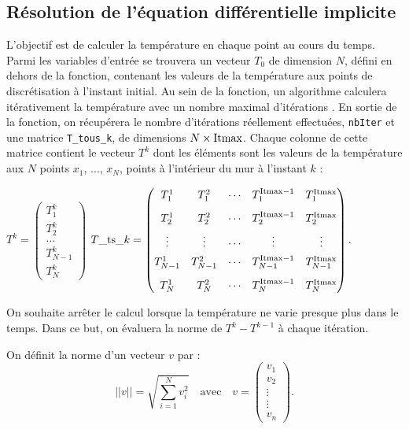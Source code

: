 \documentclass[10pt,fleqn]{article} %
\begin{document}
\begin{multicols}{2}
\section*{Résolution de l'équation différentielle implicite}
\ifprof
\else
L'objectif est de calculer la température en chaque point au cours du temps. Parmi les variables
d'entrée se trouvera un vecteur $T_0$ de dimension $N$, défini en dehors de la fonction,
 contenant les valeurs de la température aux points de discrétisation à l'instant initial. 
 Au sein de la fonction, un algorithme calculera itérativement la température avec un 
 nombre maximal d'itérations . En sortie de la fonction, on récupérera le nombre 
 d'itérations réellement effectuées, \texttt{nbIter} et une matrice \texttt{T\_tous\_k}, de
  dimensions $N\times \text{\text{Itmax}}$.  Chaque colonne de cette matrice contient le vecteur $T^k$
   dont les éléments sont les valeurs de la température aux $N$ points $x_1$, ..., $x_N$, 
 points à l'intérieur du mur à l'instant $k$ :
 
 \footnotesize
$
T^k = \begin{pmatrix} T_1^k \\  T_2 ^k \\ ... \\  T_{N-1}^{k} \\ T_{N}^{k}  \end{pmatrix}
$
$
T\_\text{ts}\_k = 
\begin{pmatrix} 
T_1^1   & T_1^2  & \cdots & T_1^{\text{Itmax}-1} & T_{1}^{\text{Itmax}} \vspace{0.3cm} \\
T_2^1   & T_2^2  & \cdots & T_2^{\text{Itmax}-1} & T_2^{\text{Itmax} }  \vspace{0.15cm}\\
\vdots & \vdots & \cdots & \vdots & \vdots \vspace{0.15cm}\\
T_{N-1}^1   & T_{N-1}^2  & \cdots & T_{N-1}^{\text{Itmax}-1} & T_{N-1}^{\text{Itmax}} \vspace{0.3cm} \\
T_{N}^1   & T_{N}^2  & \cdots & T_{N}^{\text{Itmax}-1} & T_{N}^{\text{Itmax}}  \\
 \end{pmatrix}.
$

\normalsize

On souhaite arrêter le calcul lorsque la température ne varie presque plus dans le temps. 
Dans ce but, on évaluera la norme  de $T^k - T^{k-1}$ à chaque itération. 
\begin{defi}
On définit la norme d'un vecteur $v$ par : 
$$
||v|| = \sqrt{\sum\limits_{i=1}^{N}v_i^2} \quad \text{avec} \quad v=
\begin{pmatrix} v_1 \\ v_2 \\ \vdots \\ \vdots \\ v_n \end{pmatrix}.
$$
\end{defi}


\end{multicols}
\end{document}
